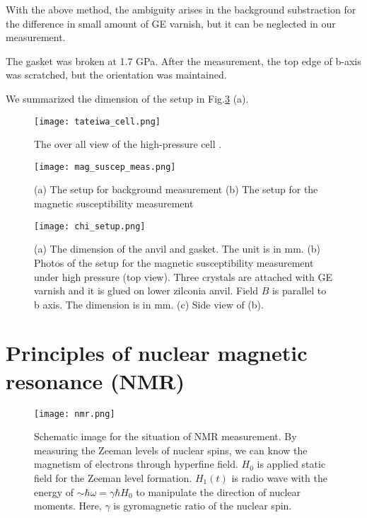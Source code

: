 \documentclass[a4,10.5pt]{report}
\begin{document}
With the above method, the ambiguity arises in the background substraction for the difference in small amount of GE varnish, but it can be neglected in our measurement.

The gasket was broken at 1.7 GPa. 
After the measurement, the top edge of b-axis was scratched, but the orientation was maintained.

We summarized the dimension of the setup in Fig.\ref{chi_setup} (a).

\begin{figure}
  \centering
  \texttt{[image: tateiwa\_cell.png]}
  \caption{The over all view of the high-pressure cell \cite{Tateiwa2011}.}
  \label{tateiwa_cell}
\end{figure}

\begin{figure}
  \centering
  \texttt{[image: mag\_suscep\_meas.png]}
  \caption{(a) The setup for background measurement
  (b) The setup for the magnetic susceptibility measurement}
  \label{chi_meas_setup}
\end{figure}

\begin{figure}
  \centering
  \texttt{[image: chi\_setup.png]}
  \caption{(a) The dimension of the anvil and gasket. The unit is in mm.
  (b) Photos of the setup for the magnetic susceptibility measurement under high pressure (top view).
  Three crystals are attached with GE varnish and it is glued on lower zilconia anvil.
  Field $B$ is parallel to b axis.
  The dimension is in mm.
  (c) Side view of (b).}
  \label{chi_setup}
\end{figure}

\newpage
\section{Principles of nuclear magnetic resonance (NMR)}

\begin{figure}[h]
  \centering
  \texttt{[image: nmr.png]}
  \caption{Schematic image for the situation of NMR measurement. 
  By measuring the Zeeman levels of nuclear spins, we can know the magnetism of electrons through hyperfine field.
  $H_0$ is applied static field for the Zeeman level formation.
  $H_1(t)$ is radio wave with the energy of $\sim\hbar\omega = \gamma\hbar H_0$ to manipulate the direction of nuclear moments.
  Here, $\gamma$ is gyromagnetic ratio of the nuclear spin.}
  \label{nmr}
\end{figure}
\end{document}
